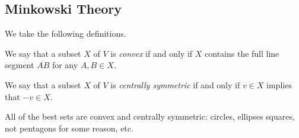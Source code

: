\documentclass[../notes.tex]{subfiles}
\begin{document}
\subsection{Minkowski Theory}
We take the following definitions.
\begin{definition}[Convex]
    We say that a subset $X$ of $V$ is \textit{convex} if and only if $X$ contains the full line segment $\overline{AB}$ for any $A,B\in X.$
\end{definition}
\begin{definition}
    We say that a subset $X$ of $V$ is \textit{centrally symmetric} if and only if $v\in X$ implies that $-v\in X.$
\end{definition}
All of the best sets are convex and centrally symmetric: circles, ellipses squares, not pentagons for some reason, etc.
\end{document}
